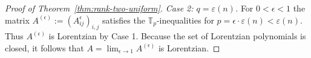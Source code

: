 \documentclass[12pt]{amsart}
\theoremstyle{definition}
\newcommand{\1}{\mathbf{1}}
\newcommand\R{{\mathbb R}}
\newcommand\T{{\mathbb T}}
\newcommand{\mk}[2][]{\todo[color=orange, #1]{\textbf{Mario}: #2}}
\begin{document}
\begin{proof}[Proof of Theorem~\ref{thm:rank-two-uniform}]
\smallskip
\noindent\emph{Case 2: $q=\varepsilon(n)$.}
    For $0<\epsilon<1$ the matrix $A^{(\epsilon)}:=(A_{ij}^\epsilon)_{i,j}$ satisfies the $\T_p$-inequalities for $p=\epsilon\cdot\varepsilon(n)<\varepsilon(n)$. Thus $A^{(\epsilon)}$ is Lorentzian by Case 1. Because the set of Lorentzian polynomials is closed, it follows that $A=\lim_{\epsilon\to1}A^{(\epsilon)}$ is Lorentzian.
%
%
%
\end{proof}
\end{document}
